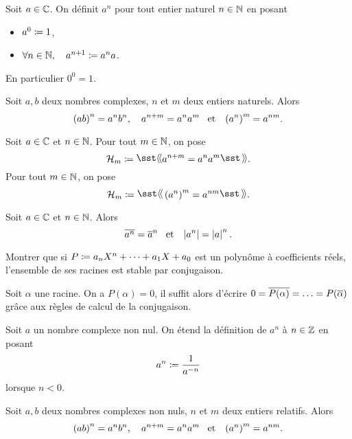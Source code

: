 \documentclass{magnolia}
\begin{document}
\begin{definition}[utile=-3]
  Soit $a\in\mathbb{C}$. On définit $a^n$ pour tout entier naturel $n\in\mathbb{N}$ en posant
  \begin{itemize}
    \item $a^0\coloneqq 1$,
    \item $\forall n\in\mathbb{N} ,\quad a^{n+1}\coloneqq a^n a$.
  \end{itemize}
\end{definition}

\begin{remarqueUnique}
\remarque En particulier $0^0=1$.
\end{remarqueUnique}

\begin{proposition}[utile=-3]
  Soit $a,b$ deux nombres complexes, $n$ et $m$ deux entiers
  naturels. Alors
  \[\left(ab\right)^n=a^n b^n, \quad a^{n+m}=a^n a^m \quad\!\text{et}\quad\! 
    \left(a^n\right)^m=a^{nm}.\]
\end{proposition}

\begin{preuve}
Soit $a\in\mathbb{C}$ et $n\in\mathbb{N}$. Pour tout $m\in\mathbb{N}$, on pose
\[\mathcal{H}_m\defeq\mog a^{n+m}=a^n a^m\mfg.\]
Pour tout $m\in\mathbb{N}$, on pose
\[\mathcal{H}_m\defeq\mog \p{a^n}^m=a^{nm}\mfg.\]
\end{preuve}

\begin{proposition}[utile=-3]
  Soit $a\in\mathbb{C}$ et $n\in\mathbb{N}$. Alors
  \[\overline{a^n}=\overline{a}^n \quad\!\text{et}\quad\! \left|a^n\right|=\left|a\right|^n.\]
\end{proposition}

\begin{exoUnique}
\exo Montrer que si $P\coloneqq a_n X^n+\cdots+a_1 X+a_0$ est un polynôme à coefficients réels, l'ensemble de ses racines est stable par conjugaison.
\end{exoUnique}

\begin{sol}
Soit $\alpha$ une racine. On a $P(\alpha)=0$, il suffit alors d'écrire $0=\overline{P(\alpha)}=\ldots=P(\overline{\alpha})$ grâce aux règles de calcul de la conjugaison.
\end{sol}

\begin{definition}
  Soit $a$ un nombre complexe non nul. On étend la définition de
  $a^n$ à $n\in\mathbb{Z}$ en posant
  $$a^n\coloneqq \frac{1}{a^{-n}}$$
  lorsque $n<0$.
\end{definition}

\begin{proposition}
Soit $a,b$ deux nombres complexes non nuls, $n$ et $m$ deux entiers
relatifs. Alors
\[\left(ab\right)^n=a^n b^n,\quad
  a^{n+m}=a^n a^m \quad\!\text{et}\quad\!
  \left(a^n\right)^m=a^{nm}.\]
\end{proposition}
\end{document}
